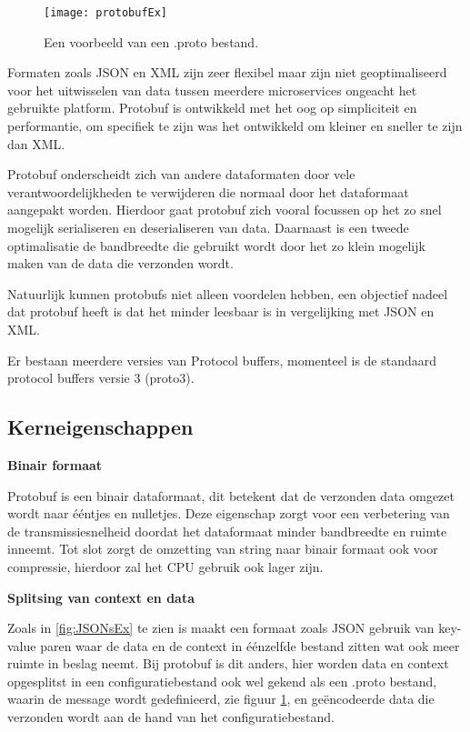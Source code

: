 \begin{figure}[H]
    \centering
    \texttt{[image: protobufEx]}
    \caption[Protocol Buffer .proto bestand]{Een voorbeeld van een .proto bestand.  \autocite{Kurian2020}}
    \label{fig:protobufEx}
\end{figure}

Formaten zoals JSON en XML zijn zeer flexibel maar zijn niet geoptimaliseerd voor het uitwisselen van data tussen meerdere microservices \autocite{Fowler2014} ongeacht het gebruikte platform. Protobuf is ontwikkeld met het oog op simpliciteit en performantie, om specifiek te zijn was het ontwikkeld om kleiner en sneller te zijn dan XML.

Protobuf onderscheidt zich van andere dataformaten door vele verantwoordelijkheden te verwijderen die normaal door het dataformaat aangepakt worden. Hierdoor gaat protobuf zich vooral focussen op het zo snel mogelijk serialiseren en deserialiseren van data. Daarnaast is een tweede optimalisatie de bandbreedte die gebruikt wordt door het zo klein mogelijk maken van de data die verzonden wordt.

Natuurlijk kunnen protobufs niet alleen voordelen hebben, een objectief nadeel dat protobuf heeft is dat het minder leesbaar is in vergelijking met JSON en XML.

Er bestaan meerdere versies van Protocol buffers, momenteel is de standaard protocol buffers versie 3 (proto3).


\subsection{Kerneigenschappen}
\label{subsec:Kerneigenschappen}

\textbf{Binair formaat}

Protobuf is een binair dataformaat, dit betekent dat de verzonden data omgezet wordt naar ééntjes en nulletjes. Deze eigenschap zorgt voor een verbetering van de transmissiesnelheid doordat het dataformaat minder bandbreedte en ruimte inneemt. Tot slot zorgt de omzetting van string naar binair formaat ook voor compressie, hierdoor zal het CPU gebruik ook lager zijn.

\textbf{Splitsing van context en data}

Zoals in \ref{fig:JSONsEx} te zien is maakt een formaat zoals JSON gebruik van key-value paren waar de data en de context in éénzelfde bestand zitten wat ook meer ruimte in beslag neemt. Bij protobuf is dit anders, hier worden data en context opgesplitst in een configuratiebestand ook wel gekend als een .proto bestand, waarin de message wordt gedefinieerd, zie figuur \ref{fig:protobufEx}, en geëncodeerde data die verzonden wordt aan de hand van het configuratiebestand.

